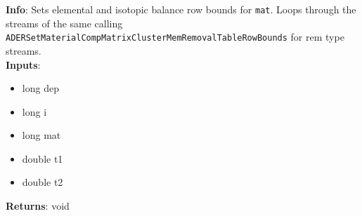 \textbf{Info}: Sets elemental and isotopic balance row bounds for \texttt{mat}.
Loops through the streams of the same calling 
\texttt{ADERSetMaterialCompMatrixClusterMemRemovalTableRowBounds} for rem type
streams.\\

\noindent \textbf{Inputs}:
\begin{itemize}
\item{long dep}
\item{long i}
\item{long mat}
\item{double t1}
\item{double t2}
\end{itemize}

\noindent \textbf{Returns}: void
